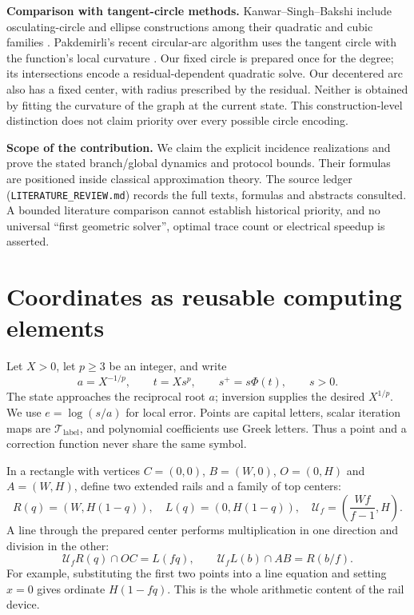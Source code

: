 \documentclass[11pt,a4paper]{article}
\newcommand{\map}[1]{\mathcal T_{\mathrm{#1}}}
\newcommand{\hub}[1]{\mathcal U_{#1}}
\begin{document}
\textbf{Comparison with tangent-circle methods.} Kanwar--Singh--Bakshi include osculating-circle and ellipse constructions among their quadratic and cubic families \cite{kanwar2008}. Pakdemirli's recent circular-arc algorithm uses the tangent circle with the function's local curvature \cite{pakdemirli2025}. Our fixed circle is prepared once for the degree; its intersections encode a residual-dependent quadratic solve. Our decentered arc also has a fixed center, with radius prescribed by the residual. Neither is obtained by fitting the curvature of the graph at the current state. This construction-level distinction does not claim priority over every possible circle encoding.

\textbf{Scope of the contribution.} We claim the explicit incidence realizations and prove the stated branch/global dynamics and protocol bounds. Their formulas are positioned inside classical approximation theory. The source ledger (\texttt{LITERATURE\_REVIEW.md}) records the full texts, formulas and abstracts consulted. A bounded literature comparison cannot establish historical priority, and no universal ``first geometric solver'', optimal trace count or electrical speedup is asserted.

\clearpage
\section{Coordinates as reusable computing elements}\label{sec:rails}
Let $X>0$, let $p\ge3$ be an integer, and write
\[
 a=X^{-1/p},\qquad t=Xs^p,\qquad s^+=s\Phi(t),\qquad s>0.
\]
The state approaches the reciprocal root $a$; inversion supplies the desired $X^{1/p}$. We use $e=\log(s/a)$ for local error. Points are capital letters, scalar iteration maps are $\map{label}$, and polynomial coefficients use Greek letters. Thus a point and a correction function never share the same symbol.

In a rectangle with vertices $C=(0,0)$, $B=(W,0)$, $O=(0,H)$ and $A=(W,H)$, define two extended rails and a family of top centers:
\begin{equation}\label{eq:rails}
 R(q)=(W,H(1-q)),\quad L(q)=(0,H(1-q)),\quad
 \hub{f}=\left(\frac{Wf}{f-1},H\right).
\end{equation}
A line through the prepared center performs multiplication in one direction and division in the other:
\begin{equation}\label{eq:railops}
 \hub{f}R(q)\cap OC=L(fq),\qquad
 \hub{f}L(b)\cap AB=R(b/f).
\end{equation}
For example, substituting the first two points into a line equation and setting $x=0$ gives ordinate $H(1-fq)$. This is the whole arithmetic content of the rail device.
\end{document}

